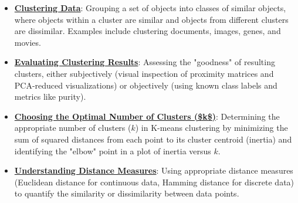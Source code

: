\documentclass{article}%
\begin{document}
\begin{itemize}[leftmargin=*]%
\item \href{https://www.math.purdue.edu/~yipn/351/12L2-distance-clusters.pdf#page=4}{\textbf{Clustering Data}}: Grouping a set of objects into classes of similar objects, where objects within a cluster are similar and objects from different clusters are dissimilar. Examples include clustering documents, images, genes, and movies.%
\item \href{https://www.math.purdue.edu/~yipn/351/12L2-distance-clusters.pdf#page=32}{\textbf{Evaluating Clustering Results}}: Assessing the "goodness" of resulting clusters, either subjectively (visual inspection of proximity matrices and PCA-reduced visualizations) or objectively (using known class labels and metrics like purity).%
\item \href{https://www.math.purdue.edu/~yipn/351/12L2-distance-clusters.pdf#page=33}{\textbf{Choosing the Optimal Number of Clusters (\$k\$)}}: Determining the appropriate number of clusters ($k$) in K-means clustering by minimizing the sum of squared distances from each point to its cluster centroid (inertia) and identifying the "elbow" point in a plot of inertia versus $k$.%
\item \href{https://www.math.purdue.edu/~yipn/351/12L2-distance-clusters.pdf#page=17}{\textbf{Understanding Distance Measures}}: Using appropriate distance measures (Euclidean distance for continuous data, Hamming distance for discrete data) to quantify the similarity or dissimilarity between data points.%
\end{itemize}%
\end{document}
